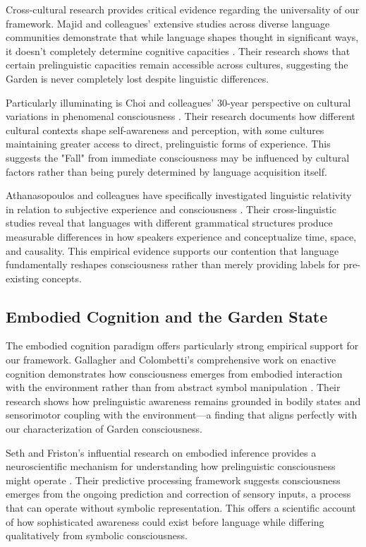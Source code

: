 Cross-cultural research provides critical evidence regarding the universality of our framework. Majid and colleagues' extensive studies across diverse language communities demonstrate that while language shapes thought in significant ways, it doesn't completely determine cognitive capacities \parencite{majid2024language}. Their research shows that certain prelinguistic capacities remain accessible across cultures, suggesting the Garden is never completely lost despite linguistic differences.

Particularly illuminating is Choi and colleagues' 30-year perspective on cultural variations in phenomenal consciousness \parencite{choi2023cultural}. Their research documents how different cultural contexts shape self-awareness and perception, with some cultures maintaining greater access to direct, prelinguistic forms of experience. This suggests the "Fall" from immediate consciousness may be influenced by cultural factors rather than being purely determined by language acquisition itself.

Athanasopoulos and colleagues have specifically investigated linguistic relativity in relation to subjective experience and consciousness \parencite{athanasopoulos2025linguistic}. Their cross-linguistic studies reveal that languages with different grammatical structures produce measurable differences in how speakers experience and conceptualize time, space, and causality. This empirical evidence supports our contention that language fundamentally reshapes consciousness rather than merely providing labels for pre-existing concepts.

\subsection{Embodied Cognition and the Garden State}

The embodied cognition paradigm offers particularly strong empirical support for our framework. Gallagher and Colombetti's comprehensive work on enactive cognition demonstrates how consciousness emerges from embodied interaction with the environment rather than from abstract symbol manipulation \parencite{gallagher2024enactive}. Their research shows how prelinguistic awareness remains grounded in bodily states and sensorimotor coupling with the environment—a finding that aligns perfectly with our characterization of Garden consciousness.

Seth and Friston's influential research on embodied inference provides a neuroscientific mechanism for understanding how prelinguistic consciousness might operate \parencite{seth2023embodied}. Their predictive processing framework suggests consciousness emerges from the ongoing prediction and correction of sensory inputs, a process that can operate without symbolic representation. This offers a scientific account of how sophisticated awareness could exist before language while differing qualitatively from symbolic consciousness.

